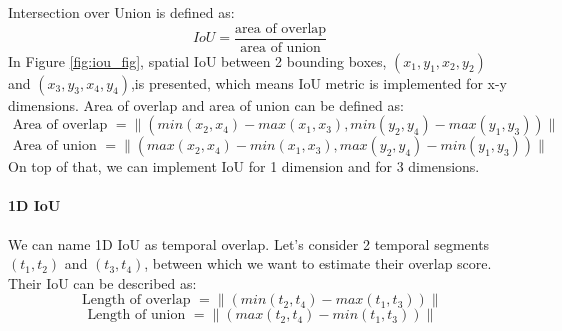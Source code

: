 Intersection over Union is defined as:
\[ IoU = \frac{\text{area of overlap}}{\text{area of union}} \]
In Figure \ref{fig:iou_fig}, spatial IoU between 2 bounding boxes, $(x_1,y_1,x_2,y_2)$ and $(x_3,y_3,x_4,y_4)$,is presented, which means IoU metric is implemented for x-y dimensions.
Area of overlap and area of union can be defined as:
\[\text{ Area of overlap } = \lVert( min(x_2,x_4) - max(x_1,x_3), min(y_2,y_4)- max(y_1,y_3) )\rVert\]
\[\text{ Area of union  }  = \lVert( max(x_2,x_4) - min(x_1,x_3), max(y_2,y_4) - min(y_1,y_3) )\rVert\]
On top of that, we can implement IoU for 1 dimension and for 3 dimensions.
\paragraph{1D IoU} We can name 1D IoU as temporal overlap. Let's consider 2 temporal segments $(t_1,t_2)$ and $(t_3,t_4)$, between which we want to
estimate their overlap score. Their IoU can be described as:
\[ \text { Length of overlap } = \lVert(min(t_2,t_4) - max(t_1,t_3))\rVert  \]
\[ \text { Length of union } = \lVert(max(t_2,t_4) - min(t_1,t_3))\rVert  \]
